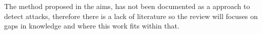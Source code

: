The method proposed in the aims, has not been documented as a approach to detect attacks, therefore there is a lack of literature so the review will focuses on gaps in knowledge and where this work fits within that.